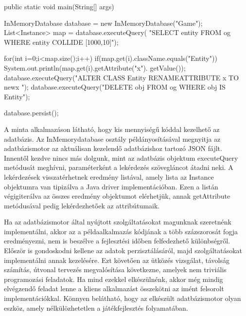 
\begin{java}
public static void main(String[] args) {
	InMemoryDatabase database = new InMemoryDatabase("Game");
	List<Instance> map = database.executeQuery(
	"SELECT entity FROM og WHERE entity COLLIDE [1000,10]");
		
	for(int i=0;i<map.size();i++){
		if(map.get(i).className.equals("Entity")){
			System.out.println(map.get(i).getAttribute("x").
			getValue());
		}
	}
	database.executeQuery("ALTER CLASS Entity
	RENAMEATTRIBUTE x TO newx ");
	database.executeQuery("DELETE obj FROM og
	WHERE obj IS Entity");
		
	database.persist();
}

\end{java}
	
A minta alkalmazáson látható, hogy kis mennyiségű kóddal kezelhető az adatbázis. Az InMemorydatabase osztály példányosításával megnyitja az adatbázismotor az aktuálisan kezelendő adatbázishoz tartozó JSON fájlt. Innentől kezdve nincs más dolgunk, mint az adatbázis objektum executeQuery metódusát meghívni, paraméterként a lekérdezés szövegláncot átadni neki. A lekérdezések visszatérhetnek eredmény listával, amely lista az Instance objektumra van tipizálva a Java driver implementációban. Ezen a listán végigiterálva az összes eredmény objektumot elérhetjük, annak getAttribute metódusával pedig lekérdezhetőek az attribútumaik.

Ha az adatbázismotor által nyújtott szolgáltatásokat magunknak szeretnénk implementálni, akkor az a példaalkalmazás kódjának a több százszorosát fogja eredményezni, nem is beszélve a fejlesztési időben felfedezhető különbségről. 
Először is gondoskodni kellene az adatok perzisztálásáról, majd   szolgáltatásokat implementálni annak kezelésére. Ezt követően az ütközés vizsgálat, távolság számítás, útvonal tervezés megvalósítása következne, amelyek nem triviális programozási feladatok. Ha mind ezekkel elkészülnénk, akkor még mindig elvégzendő feladat lenne a kliens alkalmazást összekötni az imént felsorolt implementációkkal. Könnyen belátható, hogy az elkészült adatbázismotor olyan eszköz, amely nélkülözhetetlen a játékfejlesztés folyamatában.


